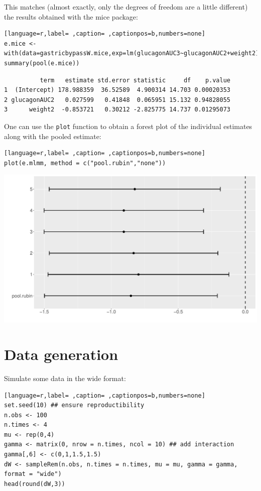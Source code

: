 \documentclass[12pt]{article}
\begin{document}
\clearpage

This matches (almost exactly, only the degrees of freedom are a little
different) the results obtained with the mice package:
\begin{lstlisting}[language=r,label= ,caption= ,captionpos=b,numbers=none]
e.mice <- with(data=gastricbypassW.mice,exp=lm(glucagonAUC3~glucagonAUC2+weight2))
summary(pool(e.mice))
\end{lstlisting}

\begin{verbatim}
          term   estimate std.error statistic     df    p.value
1  (Intercept) 178.988359  36.52589  4.900314 14.703 0.00020353
2 glucagonAUC2   0.027599   0.41848  0.065951 15.132 0.94828055
3      weight2  -0.853721   0.30212 -2.825775 14.737 0.01295073
\end{verbatim}


One can use the \texttt{plot} function to obtain a forest plot of the
individual estimates along with the pooled estimate:
\begin{lstlisting}[language=r,label= ,caption= ,captionpos=b,numbers=none]
plot(e.mlmm, method = c("pool.rubin","none"))
\end{lstlisting}

\begin{center}
\includegraphics[trim={0 0 0 0},width=1\textwidth]{./figures/forestplot.pdf}
\end{center}

\clearpage

\section{Data generation}
\label{sec:org4e5fbed}
Simulate some data in the wide format:
\begin{lstlisting}[language=r,label= ,caption= ,captionpos=b,numbers=none]
set.seed(10) ## ensure reproductibility
n.obs <- 100
n.times <- 4
mu <- rep(0,4)
gamma <- matrix(0, nrow = n.times, ncol = 10) ## add interaction
gamma[,6] <- c(0,1,1.5,1.5)
dW <- sampleRem(n.obs, n.times = n.times, mu = mu, gamma = gamma, format = "wide")
head(round(dW,3))
\end{lstlisting}
\end{document}
